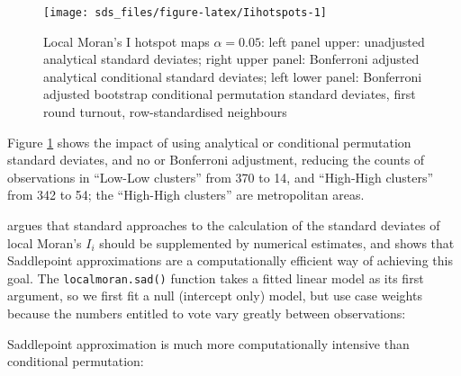 \documentclass[]{book}
\newenvironment{Shaded}{\begin{snugshade}}{\end{snugshade}}
\newcommand{\CommentTok}[1]{\textcolor[rgb]{0.56,0.35,0.01}{\textit{#1}}}
\newcommand{\DataTypeTok}[1]{\textcolor[rgb]{0.13,0.29,0.53}{#1}}
\newcommand{\DecValTok}[1]{\textcolor[rgb]{0.00,0.00,0.81}{#1}}
\newcommand{\KeywordTok}[1]{\textcolor[rgb]{0.13,0.29,0.53}{\textbf{#1}}}
\newcommand{\NormalTok}[1]{#1}
\newcommand{\OperatorTok}[1]{\textcolor[rgb]{0.81,0.36,0.00}{\textbf{#1}}}
\newcommand{\StringTok}[1]{\textcolor[rgb]{0.31,0.60,0.02}{#1}}
\begin{document}
\begin{figure}

{\centering \texttt{[image: sds\_files/figure-latex/Iihotspots-1]} 

}

\caption{Local Moran's I hotspot maps \(\alpha = 0.05\): left panel upper: unadjusted analytical standard deviates; right upper panel: Bonferroni adjusted analytical conditional standard deviates; left lower panel: Bonferroni adjusted bootstrap conditional permutation standard deviates, first round turnout, row-standardised neighbours}\label{fig:Iihotspots}
\end{figure}

Figure \ref{fig:Iihotspots} shows the impact of using analytical or conditional permutation standard deviates, and no or Bonferroni adjustment, reducing the counts of observations in ``Low-Low clusters'' from 370 to 14, and ``High-High clusters'' from 342 to 54; the ``High-High clusters'' are metropolitan areas.

\citet{tiefelsdorf:02} argues that standard approaches to the calculation of the standard deviates of local Moran's \(I_i\) should be supplemented by numerical estimates, and shows that Saddlepoint approximations are a computationally efficient way of achieving this goal. The \texttt{localmoran.sad()} function takes a fitted linear model as its first argument, so we first fit a null (intercept only) model, but use case weights because the numbers entitled to vote vary greatly between observations:

\begin{Shaded}
\end{Shaded}

Saddlepoint approximation is much more computationally intensive than conditional permutation:

\begin{Shaded}
\end{Shaded}
\end{document}
